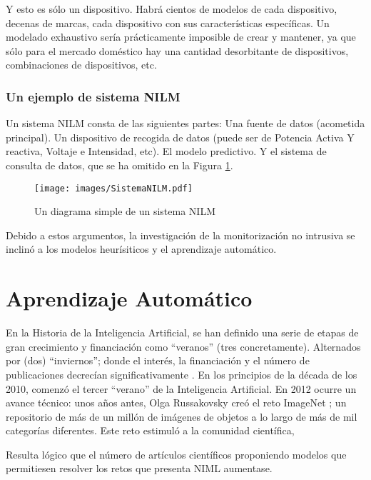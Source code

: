 Y esto es sólo un dispositivo. Habrá cientos de modelos de cada dispositivo, decenas de marcas, cada dispositivo con sus características específicas. 
Un modelado exhaustivo sería prácticamente imposible de crear y mantener, ya que sólo para el mercado doméstico hay una cantidad desorbitante de dispositivos, combinaciones de dispositivos, etc.

\subsubsection{Un ejemplo de sistema NILM}
Un sistema NILM consta de las siguientes partes: Una fuente de datos (acometida principal). Un dispositivo de recogida de datos (puede ser de Potencia Activa Y reactiva, Voltaje e Intensidad, etc). El modelo predictivo. Y el sistema de consulta de datos, que se ha omitido en la Figura \ref{diagramaNILM}.
\begin{figure}
    \centering
    \texttt{[image: images/SistemaNILM.pdf]}
    \caption{Un diagrama simple de un sistema NILM}
    \label{diagramaNILM}
\end{figure}

Debido a estos argumentos, la investigación de la monitorización no intrusiva se inclinó a los modelos heurísiticos y el aprendizaje automático.


\section{Aprendizaje Automático}

En la Historia de la Inteligencia Artificial, se han definido una serie de etapas de gran crecimiento y financiación como  \foreignquote{spanish}{veranos} (tres concretamente). Alternados por (dos) \foreignquote{spanish}{inviernos}; donde el interés, la financiación y el número de publicaciones decrecían significativamente \autocite{briefAIHistory}.
En los principios de la década de los 2010, comenzó el tercer \enquote{verano} de la Inteligencia Artificial. En 2012 ocurre un avance técnico: unos años antes, Olga Russakovsky creó el reto ImageNet \autocite{ImageNetRussakovsky}; un repositorio de más de un millón de imágenes de objetos a lo largo de más de mil categorías diferentes. 
Este reto estimuló a la comunidad científica, 

Resulta lógico que el número de artículos científicos proponiendo modelos que permitiesen resolver los retos que presenta NIML aumentase.


